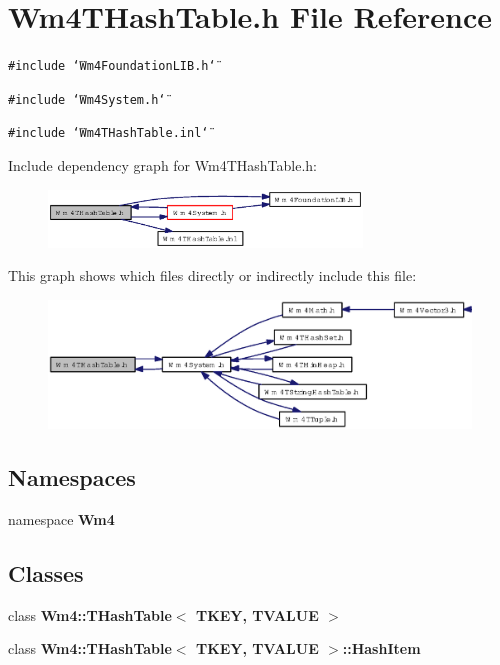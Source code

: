 \section{Wm4THash\-Table.h File Reference}
\label{Wm4THashTable_8h}
{\tt \#include \char`\"{}Wm4Foundation\-LIB.h\char`\"{}}\par
{\tt \#include \char`\"{}Wm4System.h\char`\"{}}\par
{\tt \#include \char`\"{}Wm4THash\-Table.inl\char`\"{}}\par


Include dependency graph for Wm4THash\-Table.h:\begin{figure}[H]
\begin{center}
\leavevmode
\includegraphics[width=236pt]{Wm4THashTable_8h__incl}
\end{center}
\end{figure}


This graph shows which files directly or indirectly include this file:\begin{figure}[H]
\begin{center}
\leavevmode
\includegraphics[width=358pt]{Wm4THashTable_8h__dep__incl}
\end{center}
\end{figure}
\subsection*{Namespaces}
\begin{CompactItemize}
\item 
namespace {\bf Wm4}
\end{CompactItemize}
\subsection*{Classes}
\begin{CompactItemize}
\item 
class {\bf Wm4::THash\-Table$<$ TKEY, TVALUE $>$}
\item 
class \textbf{Wm4::THash\-Table$<$ TKEY, TVALUE $>$::Hash\-Item}
\end{CompactItemize}
